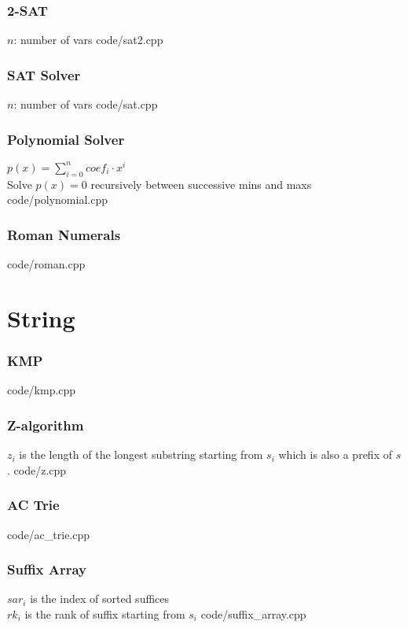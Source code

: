 \documentclass [landscape,8pt,a4paper,twocolumn]{article}
\begin{document}
\section{2-SAT}
$ n $: number of vars
 {code/sat2.cpp}

\section{SAT Solver}
$ n $: number of vars
 {code/sat.cpp}

\section{Polynomial Solver}
$ p(x)=\sum_{i=0}^{n} coef_i \cdot x^i $ \\
Solve $ p(x)=0 $ recursively between successive mins and maxs
 {code/polynomial.cpp}

\vfill\null

\section{Roman Numerals}
 {code/roman.cpp}

\newpage
\part{String}

\section{KMP}
 {code/kmp.cpp}

\section{Z-algorithm}
$ z_i $ is the length of the longest substring starting from $ s_i $ which is also a prefix of $ s $.
 {code/z.cpp}

\section{AC Trie}
 {code/ac_trie.cpp}

\vfill\null

\section{Suffix Array}
$ sar_i $ is the index of sorted suffices \\
$ rk_i $ is the rank of suffix starting from $ s_i $
 {code/suffix_array.cpp}
\end{document}
